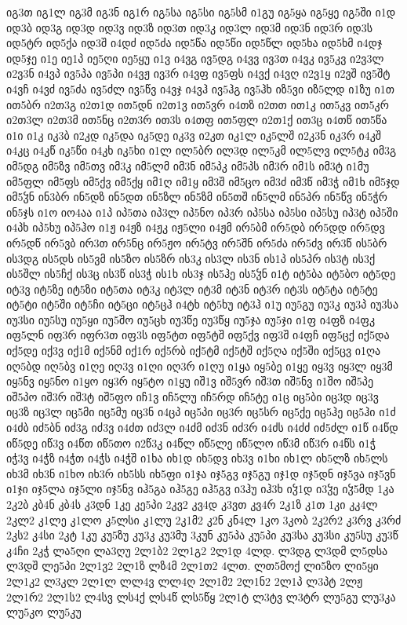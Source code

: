 {იგ3თ
იგ1ლ
იგ3მ
იგ3ნ
იგ1რ
იგ5სა
იგ5სი
იგ5სმ
ი1გუ
იგ5ყა
იგ5ყე
იგ5ში
ი1დ
იდ3ბ
იდ3გ
იდ3დ
იდ3ვ
იდ3ზ
იდ3თ
იდ3კ
იდ3ლ
იდ3მ
იდ3ნ
იდ3რ
იდ3ს
იდ5ტრ
იდ5ქა
იდ3შ
ი4დძ
იდ5ძა
იდ5წა
იდ5წი
იდ5წლ
იდ5ხა
იდ5ხმ
ი4დჯ
იდ5ჯე
ი1ე
იე1პ
იე5ღი
იე5ყუ
ი1ვ
ი4ვგ
ივ5დგ
ი4ვვ
ივ3თ
ი4ვკ
ივ5კვ
ი2ვ3ლ
ი2ვ3ნ
ი4ვპ
ივ5პა
ივ5პი
ი4ვჟ
ივ3რ
ი4ვფ
ივ5ფს
ი4ვქ
ი4ვღ
ი2ვ1ყ
ი2ვშ
ივ5შტ
ი4ვჩ
ი4ვძ
ივ5ძა
ივ5ძლ
ივ5წვ
ი4ვჯ
ი4ვჰ
ივ5ჰგ
ივ5ჰხ
იზ5ვი
იზ5ლდ
ი1ზუ
ი1თ
ით5ბრ
ი2თ3გ
ი2თ1დ
ით5დნ
ი2თ1ვ
ით5ვრ
ი4თზ
ი2თთ
ით1კ
ით5კვ
ით5კრ
ი2თ3ლ
ი2თ3მ
ით5ნც
ი2თ3რ
ით3ს
ი4თფ
ით5ფლ
ი2თ1ქ
ით3ც
ი4თწ
ით5წა
ი1ი
ი1კ
იკ3ბ
ი2კდ
იკ5და
იკ5დე
იკ3ვ
ი2კთ
იკ1ლ
იკ5ლშ
ი2კ3ნ
იკ3რ
ი4კშ
ი4კც
ი4კწ
იკ5წი
ი4კხ
იკ5ხი
ი1ლ
ილ5ბრ
ილ3დ
ილ5კმ
ილ5ლვ
ილ5ტკ
იმ3გ
იმ5დგ
იმ5ზვ
იმ5თვ
იმ3კ
იმ5ლმ
იმ3ნ
იმ5პკ
იმ5პს
იმ3რ
იმ1ს
იმ3ტ
ი1მუ
იმ5ფლ
იმ5ფს
იმ5ქვ
იმ5ქყ
იმ1ღ
იმ1ყ
იმ3შ
იმ5ცო
იმ3ძ
იმ3წ
იმ3ჭ
იმ1ხ
იმ5ჯდ
იმ5ჴნ
ინ3ბრ
ინ5დზ
ინ5დთ
ინ5ზლ
ინ5ზმ
ინ5თშ
ინ5ლმ
ინ5პრ
ინ5წვ
ინ5ჭრ
ინ5ჯს
ი1ო
იო4აა
ი1პ
იპ5თა
იპ3ლ
იპ5ნო
იპ3რ
იპ5სა
იპ5სი
იპ5სუ
იპ3ტ
იპ5ში
ი4პხ
იპ5ხუ
იპ5ჰო
ი1ჟ
ი4ჟზ
ი4ჟკ
იჟ5ლი
ი4ჟმ
ირ5ბმ
ირ5დბ
ირ5დდ
ირ5დვ
ირ5დწ
ირ5ვბ
ირ3თ
ირ5ნც
ირ5ჟო
ირ5ტვ
ირ5შნ
ირ5ძა
ირ5ძვ
ირ3წ
ის5ბრ
ის3დგ
ის5დს
ის5ვმ
ის5ზო
ის5ზრ
ის3კ
ის3ლ
ის3ნ
ის1პ
ის5პრ
ის3ტ
ის3ქ
ის5შლ
ის5ჩქ
ის3ც
ის3წ
ის3ჭ
ის1ხ
ის3ჯ
ის5ჰე
ის5ჴნ
ი1ტ
იტ5ბა
იტ5ბო
იტ5დე
იტ3ვ
იტ5ზე
იტ5ზი
იტ5თა
იტ3კ
იტ3ლ
იტ3მ
იტ3ნ
იტ3რ
იტ3ს
იტ5ტა
იტ5ტე
იტ5ტი
იტ5ში
იტ5ჩი
იტ5ცი
იტ5ცჰ
ი4ტხ
იტ5ხუ
იტ3ჰ
ი1უ
იუ5გუ
იუ3კ
იუ3პ
იუ3სა
იუ3სი
იუ5სუ
იუ5ყი
იუ5შო
იუ5ცხ
იუ3წე
იუ3წყ
იუ5ჯა
იუ5ჯი
ი1ფ
ი4ფზ
ი4ფკ
იფ5ლნ
იფ3რ
იფრ3თ
იფ3ს
იფ5ტთ
იფ5ტშ
იფ5ქვ
იფ3შ
ი4ფჩ
იფ5ცქ
იქ5და
იქ5დე
იქ3ვ
იქ1მ
იქ5ნმ
იქ1რ
იქ5რბ
იქ5ტმ
იქ5ტშ
იქ5ღა
იქ5ში
იქ5ცვ
ი1ღა
იღ5ბდ
იღ5ბვ
ი1ღე
იღ3ვ
ი1ღი
იღ3რ
ი1ღუ
ი1ყა
იყ5ბე
ი1ყე
იყ3ვ
იყ3ლ
იყ3მ
იყ5ნვ
იყ5ნო
ი1ყო
იყ3რ
იყ5ტო
ი1ყუ
იშ1ვ
იშ5ვრ
იშ3თ
იშ5ნვ
ი1შო
იშ5პე
იშ5პო
იშ3რ
იშ3ტ
იშ5ფო
იჩ1ვ
იჩ5ლუ
იჩ5რდ
იჩ5ტე
ი1ც
იც5ბი
იც3დ
იც3ვ
იც3ზ
იც3ლ
იც5მი
იც5მუ
იც3ნ
ი4ცპ
იც5პი
იც3რ
იც5სრ
იც5ქე
იც5ჰე
იც5ჰი
ი1ძ
ი4ძბ
იძ5ბნ
იძ3გ
იძ3ვ
ი4ძთ
იძ3ლ
ი4ძმ
იძ3ნ
იძ3რ
ი4ძს
ი4ძძ
იძ5ძლ
ი1წ
ი4წდ
იწ5დე
იწ3ვ
ი4წთ
იწ5თო
ი2წ3კ
ი4წლ
იწ5ლე
იწ5ლო
იწ3მ
იწ3რ
ი4წს
ი1ჭ
იჭ3ვ
ი4ჭზ
ი4ჭთ
ი4ჭს
ი4ჭშ
ი1ხა
იხ1დ
იხ5დვ
იხ3ვ
ი1ხი
იხ1ლ
იხ5ლზ
იხ5ლს
იხ3მ
იხ3ნ
ი1ხო
იხ3რ
იხ5სს
იხ5ფი
ი1ჯა
იჯ5გვ
იჯ5გუ
იჯ1დ
იჯ5დნ
იჯ5ვა
იჯ5ვნ
ი1ჯი
იჯ5ლა
იჯ5ლი
იჯ5ნვ
იჰ5გა
იჰ5გე
იჰ5გვ
ი3ჰუ
იჰ3ხ
იჴ1დ
ი3ჴე
იჴ5მდ
1კა
2კ2ბ
კბ4ნ
კბ4ს
კ3დნ
1კე
კე5პი
2კვ2
კვ4დ
კ3ვთ
კვ4რ
2კ1ზ
კ1თ
1კი
კკ4ლ
2კლ2
კ1ლე
კ1ლო
კ5ლსი
კ1ლუ
2კ1მ2
კ2ნ
კნ4ლ
1კო
3კობ
2კ2რ2
კ3რვ
კ3რძ
2კს2
კ4სი
2კტ
1კუ
კუ5ზუ
კუ3კ
კუ3მუ
3კუნ
კუ5პა
კუ5პი
კუ3სა
კუ3სი
კუ5სუ
კუ3წ
კ4ჩი
2კჭ
ლა5ღი
ლა3ღუ
2ლ1ბ2
2ლ1გ2
2ლ1დ
4ლდ.
ლ3დგ
ლ3დმ
ლ5დსა
ლ3დშ
ლე5პი
2ლ1ვ2
2ლ1ზ
ლზ4მ
2ლ1თ2
4ლთ.
ლთ5მოქ
ლი5ზო
ლი5ყი
2ლ1კ2
ლ3კლ
2ლ1ლ
ლლ4ვ
ლლ4ღ
2ლ1მ2
2ლ1ნ2
2ლ1პ
ლ3პტ
2ლჟ
2ლ1რ2
2ლ1ს2
ლ4სვ
ლს4ქ
ლს4წ
ლს5წყ
2ლ1ტ
ლ3ტვ
ლ3ტრ
ლუ5გუ
ლუ3კა
ლუ5კო
ლუ5კუ
}
